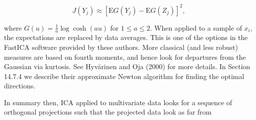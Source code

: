 \documentclass[10pt]{article}
\begin{document}
\begin{equation*}
J\left(Y_{j}\right) \approx\left[\mathrm{E} G\left(Y_{j}\right)-\mathrm{E} G\left(Z_{j}\right)\right]^{2}, \tag{14.87}
\end{equation*}


where $G(u)=\frac{1}{a} \log \cosh (a u)$ for $1 \leq a \leq 2$. When applied to a sample of $x_{i}$, the expectations are replaced by data averages. This is one of the options in the FastICA software provided by these authors. More classical (and less robust) measures are based on fourth moments, and hence look for departures from the Gaussian via kurtosis. See Hyvärinen and Oja (2000) for more details. In Section 14.7.4 we describe their approximate Newton algorithm for finding the optimal directions.

In summary then, ICA applied to multivariate data looks for a sequence of orthogonal projections such that the projected data look as far from
\end{document}
